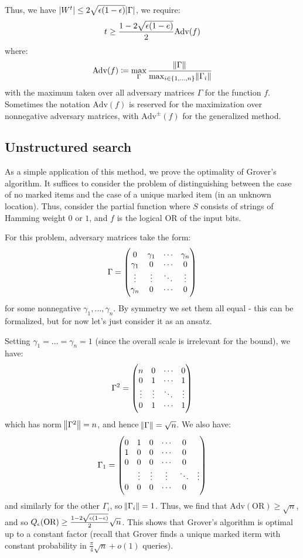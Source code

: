 Thus, we have $\lvert W^t \rvert \leq 2\sqrt{\epsilon(1-\epsilon)}\lvert \Gamma \rvert$, we require:
\begin{equation}
    t \geq \frac{1-2\sqrt{\epsilon(1-e)}}{2}\text{Adv}(f)
\end{equation}
where:
\begin{equation}
    \text{Adv}(f) \coloneqq \max_\Gamma \frac{\norm{\Gamma}}{\max_{i \in \set{1, \ldots, n}}\norm{\Gamma_i}}
\end{equation}
with the maximum taken over all adversary matrices $\Gamma$ for the function $f$. Sometimes the notation $\text{Adv}(f)$ is reserved for the maximization over nonnegative adversary matrices, with $\text{Adv}^\pm(f)$ for the generalized method.

\subsection*{Unstructured search}
As a simple application of this method, we prove the optimality of Grover’s algorithm. It suffices to consider the problem of distinguishing between the case of no marked items and the case of a unique marked item (in an unknown location). Thus, consider the partial function where $S$ consists of strings of Hamming weight $0$ or $1$, and $f$ is the logical OR of the input bits. 

For this problem, adversary matrices take the form:
\begin{equation}
    \Gamma = \begin{pmatrix}0 & \gamma_1 & \cdots & \gamma_n \\ \gamma_1 & 0 & \cdots & 0 \\ \vdots & \vdots & \ddots & \vdots \\ \gamma_n & 0 & \cdots & 0\end{pmatrix}
\end{equation}
for some nonnegative $\gamma_1, \ldots, \gamma_n$. By symmetry we set them all equal - this can be formalized, but for now let's just consider it as an ansatz.

Setting $\gamma_1 = \ldots = \gamma_n = 1$ (since the overall scale is irrelevant for the bound), we have:
\begin{equation}
    \Gamma^2 = \begin{pmatrix}n & 0 & \cdots & 0 \\ 0 & 1 & \cdots & 1 \\ \vdots & \vdots & \ddots & \vdots \\ 0 & 1 & \cdots & 1\end{pmatrix}
\end{equation}
which has norm $\norm{\Gamma^2} = n$, and hence $\norm{\Gamma} = \sqrt{n}$. We also have:
\begin{equation}
    \Gamma_1 = \begin{pmatrix}0 & 1 & 0 & \cdots & 0 \\ 1 & 0 & 0 & \cdots & 0 \\ 0 & 0 & 0 & \cdots & 0 \\ & \vdots & \vdots & \vdots & \ddots & \vdots \\ 0 & 0 & 0 & \cdots & 0\end{pmatrix}
\end{equation}
and similarly for the other $\Gamma_i$, so $\norm{\Gamma_i} = 1$. Thus, we find that $\text{Adv}(\text{OR}) \geq \sqrt{n}$, and so $Q_{\epsilon}(\text{OR}) \geq \frac{1-2\sqrt{\epsilon(1-\epsilon)}}{2}\sqrt{n}$. This shows that Grover's algorithm is optimal up to a constant factor (recall that Grover finds a unique marked iterm with constant probability in $\frac{\pi}{4}\sqrt{n} + o(1)$ queries).